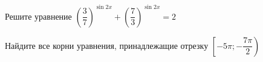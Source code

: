 \begin{ex}
	\begin{condition}
		\begin{enumcols}[label=\asbuk*)]
			\item Решите уравнение \( \left(\dfrac{3}{7}\right)^{\sin 2x} + \left(\dfrac{7}{3}\right)^{\sin 2x} =2 \)
			\item Найдите все корни уравнения, принадлежащие отрезку \( \left[-5\pi;-\dfrac{7\pi}{2}\right) \)
		\end{enumcols}
	\end{condition}
\end{ex}